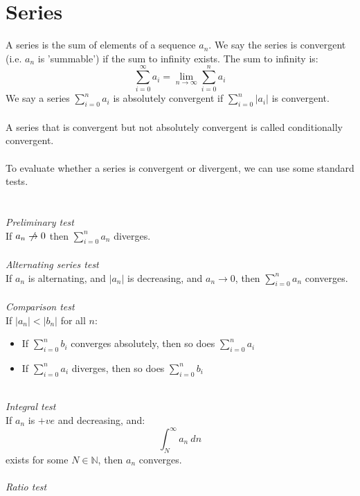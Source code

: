 \documentclass{scrartcl}
\newcommand{\N}{\mathbb{N}}
\begin{document}
\section{Series} \label{series}
A series is the sum of elements of a sequence $ a_{n} $. We say the series is convergent (i.e. $ a_{n} $ is 'summable') if the sum to infinity exists. The sum to infinity is:
\begin{equation}
\sum_{i=0}^{\infty} a_{i} = \lim_{n \to \infty} \sum_{i=0}^{n} a_{i}
\end{equation}
We say a series $ \sum_{i=0}^{n} a_{i} $ is absolutely convergent if $ \sum_{i=0}^{n} |a_{i}| $ is convergent.
\\\\
A series that is convergent but not absolutely convergent is called conditionally convergent.
\\\\
To evaluate whether a series is convergent or divergent, we can use some standard tests.
\\\\
\\
\textit{Preliminary test}
\\
If $ a_{n} \centernot\to 0 $ then $ \sum_{i=0}^{n} a_{n} $ diverges.
\\\\
\textit{Alternating series test}
\\
If $ a_{n} $ is alternating, and $ |a_{n}| $ is decreasing, and $ a_{n} \to 0 $, then 
$ \sum_{i=0}^{n} a_{n} $ converges.
\\\\
\textit{Comparison test}
\\
If $ |a_{n}| < |b_{n}| $ for all $ n $:
\begin{itemize}
\item If $ \sum_{i=0}^{n} b_{i} $ converges absolutely, then so does $ \sum_{i=0}^{n} a_{i} $
\item If $ \sum_{i=0}^{n} a_{i} $ diverges, then so does $ \sum_{i=0}^{n} b_{i} $
\end{itemize}
\noindent
\\
\textit{Integral test}
\\
If $ a_{n} $ is $ +ve $ and decreasing, and:
\begin{equation}
\int_{N}^{\infty} a_{n} \ dn
\end{equation}
exists for some $ N \in \N $, then $ a_{n} $ converges.
\\\\
\textit{Ratio test}
\\
\end{document}
